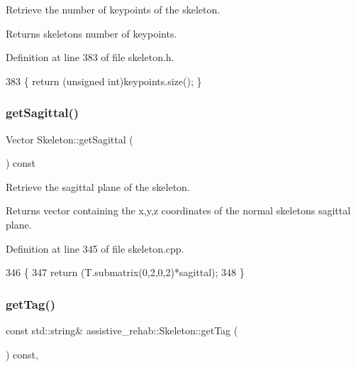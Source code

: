 Retrieve the number of keypoints of the skeleton. 

\begin{DoxyReturn}{Returns}
skeleton\textquotesingle{}s number of keypoints. 
\end{DoxyReturn}


Definition at line 383 of file skeleton.\+h.


\begin{DoxyCode}
383 \{ \textcolor{keywordflow}{return} (\textcolor{keywordtype}{unsigned} \textcolor{keywordtype}{int})keypoints.size(); \}
\end{DoxyCode}
\mbox{\label{classassistive__rehab_1_1Skeleton_a83133fabc903ddd4e54edf59df977167}} 
\subsubsection{\texorpdfstring{get\+Sagittal()}{getSagittal()}}
{\footnotesize\ttfamily Vector Skeleton\+::get\+Sagittal (\begin{DoxyParamCaption}{ }\end{DoxyParamCaption}) const\hspace{0.3cm}{\ttfamily [inherited]}}



Retrieve the sagittal plane of the skeleton. 

\begin{DoxyReturn}{Returns}
vector containing the x,y,z coordinates of the normal skeleton\textquotesingle{}s sagittal plane. 
\end{DoxyReturn}


Definition at line 345 of file skeleton.\+cpp.


\begin{DoxyCode}
346 \{
347     \textcolor{keywordflow}{return} (T.submatrix(0,2,0,2)*sagittal);
348 \}
\end{DoxyCode}
\mbox{\label{classassistive__rehab_1_1Skeleton_a185654045d5e43b3853cdb8fdd676da6}} 
\subsubsection{\texorpdfstring{get\+Tag()}{getTag()}}
{\footnotesize\ttfamily const std\+::string\& assistive\+\_\+rehab\+::\+Skeleton\+::get\+Tag (\begin{DoxyParamCaption}{ }\end{DoxyParamCaption}) const\hspace{0.3cm}{\ttfamily [inline]}, {\ttfamily [inherited]}}



